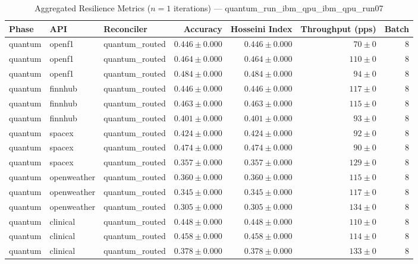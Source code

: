 
\begin{table}[htbp]
\caption{Aggregated Resilience Metrics ($n=1$ iterations) --- quantum_run_ibm_qpu_ibm_qpu_run07}
\begin{tabular}{l l l r r r r}
\hline
Phase & API & Reconciler & Accuracy & Hosseini Index & Throughput (pps) & Batch \\
\hline
quantum & openf1 & quantum\_routed & $0.446\pm0.000$ & $0.446\pm0.000$ & $70\pm0$ & 8 \\
quantum & openf1 & quantum\_routed & $0.464\pm0.000$ & $0.464\pm0.000$ & $110\pm0$ & 8 \\
quantum & openf1 & quantum\_routed & $0.484\pm0.000$ & $0.484\pm0.000$ & $94\pm0$ & 8 \\
quantum & finnhub & quantum\_routed & $0.446\pm0.000$ & $0.446\pm0.000$ & $117\pm0$ & 8 \\
quantum & finnhub & quantum\_routed & $0.463\pm0.000$ & $0.463\pm0.000$ & $115\pm0$ & 8 \\
quantum & finnhub & quantum\_routed & $0.401\pm0.000$ & $0.401\pm0.000$ & $93\pm0$ & 8 \\
quantum & spacex & quantum\_routed & $0.424\pm0.000$ & $0.424\pm0.000$ & $92\pm0$ & 8 \\
quantum & spacex & quantum\_routed & $0.474\pm0.000$ & $0.474\pm0.000$ & $90\pm0$ & 8 \\
quantum & spacex & quantum\_routed & $0.357\pm0.000$ & $0.357\pm0.000$ & $129\pm0$ & 8 \\
quantum & openweather & quantum\_routed & $0.360\pm0.000$ & $0.360\pm0.000$ & $115\pm0$ & 8 \\
quantum & openweather & quantum\_routed & $0.345\pm0.000$ & $0.345\pm0.000$ & $117\pm0$ & 8 \\
quantum & openweather & quantum\_routed & $0.305\pm0.000$ & $0.305\pm0.000$ & $134\pm0$ & 8 \\
quantum & clinical & quantum\_routed & $0.448\pm0.000$ & $0.448\pm0.000$ & $110\pm0$ & 8 \\
quantum & clinical & quantum\_routed & $0.458\pm0.000$ & $0.458\pm0.000$ & $114\pm0$ & 8 \\
quantum & clinical & quantum\_routed & $0.378\pm0.000$ & $0.378\pm0.000$ & $133\pm0$ & 8 \\

\end{tabular}
\end{table}
